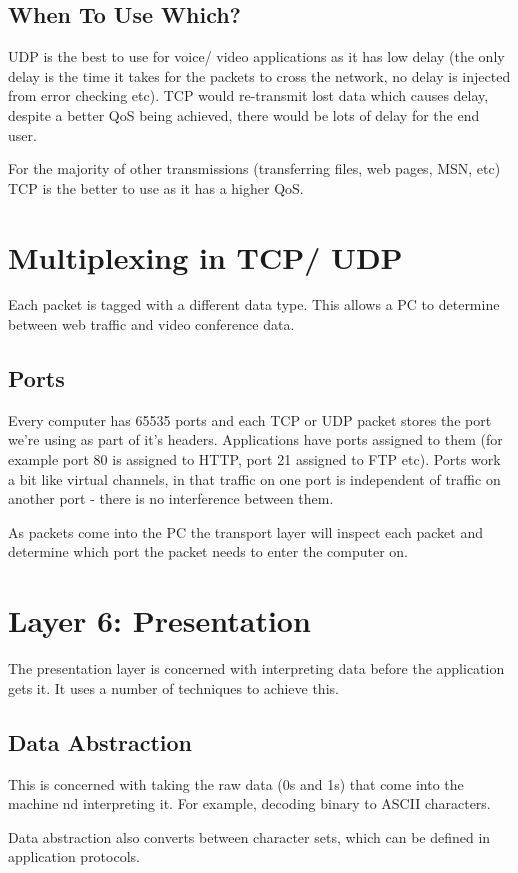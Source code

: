 \subsection*{When To Use Which?}
UDP is the best to use for voice/ video applications as it has low delay (the only delay is the time it takes for the packets to cross the network, no delay is injected from error checking etc). TCP would re-transmit lost data which causes delay, despite a better QoS being achieved, there would be lots of delay for the end user.

For the majority of other transmissions (transferring files, web pages, MSN, etc) TCP is the better to use as it has a higher QoS. 

\section*{Multiplexing in TCP/ UDP}
Each packet is tagged with a different data type. This allows a PC to determine between web traffic and video conference data.
\subsection*{Ports}
Every computer has 65535 ports and each TCP or UDP packet stores the port we're using as part of it's headers. Applications have ports assigned to them (for example port 80 is assigned to HTTP, port 21 assigned to FTP etc). Ports work a bit like virtual channels, in that traffic on one port is independent of traffic on another port - there is no interference between them. 

As packets come into the PC the transport layer will inspect each packet and determine which port the packet needs to enter the computer on.

\section*{Layer 6: Presentation}
The presentation layer is concerned with interpreting data before the application gets it. It uses a number of techniques to achieve this.
\subsection*{Data Abstraction}
This is concerned with taking the raw data (0s and 1s) that come into the machine nd interpreting it. For example, decoding binary to ASCII characters. 

Data abstraction also converts between character sets, which can be defined in application protocols.

